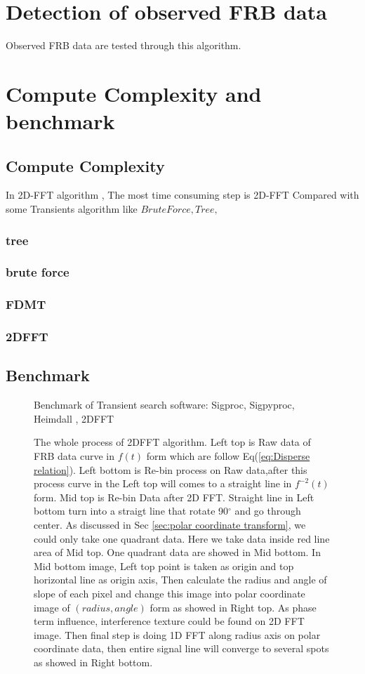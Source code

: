 \documentclass[twocolumn]{aastex61}
\begin{document}
\section{Detection of observed FRB data}
Observed FRB data are tested through this algorithm. 
\section{Compute Complexity and benchmark}
\subsection{Compute Complexity}
In 2D-FFT algorithm , The most time consuming step is 2D-FFT
Compared with some Transients algorithm like $Brute Force, Tree,$
\subsubsection*{tree}
\subsubsection*{brute force}
\subsubsection*{FDMT}
\subsubsection*{2DFFT}
\subsection{Benchmark}
\begin{figure}[ht!]
\caption{Benchmark of Transient search software: Sigproc, Sigpyproc, Heimdall , 2DFFT \label{fig:benchmark}}
\end{figure} 
 

\begin{figure}[ht!]
\caption{The whole process of 2DFFT algorithm. Left top is Raw data of FRB data curve in $f(t)$ form which are follow Eq(\ref{eq:Disperse relation}). Left bottom is Re-bin process on Raw data,after this process curve in the Left top will comes to a straight line in $f^{-2}(t)$ form. Mid top is Re-bin Data after 2D FFT. Straight line in Left bottom turn into a straigt line that rotate 90$^{\circ}$ and go through center. As discussed in Sec \ref{sec:polar coordinate transform}, we could only take one quadrant data. Here we take data inside red line area of Mid top. One quadrant data are showed in Mid bottom. In Mid bottom image, Left top point is taken as origin and top horizontal line as origin axis, Then calculate the radius and angle of slope of each pixel and change this image into polar coordinate image of $(radius,angle)$ form as showed in Right top. As phase term influence, interference 	texture could be found on 2D FFT image. Then final step is doing 1D FFT along radius axis on polar coordinate data, then entire signal line will converge to several spots as showed in Right bottom.  \label{fig:Procedure}}
\end{figure}
\end{document}

